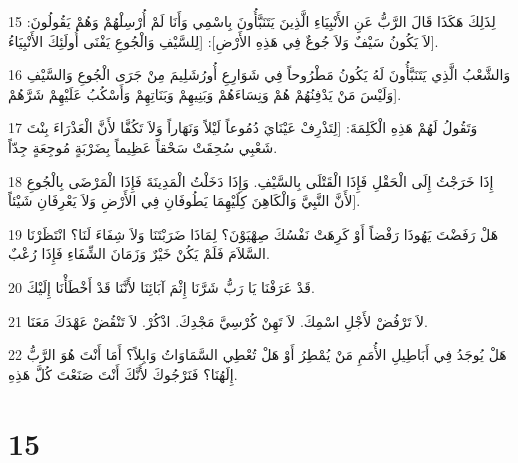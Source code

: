 \par 15 لِذَلِكَ هَكَذَا قَالَ الرَّبُّ عَنِ الأَنْبِيَاءِ الَّذِينَ يَتَنَبَّأُونَ بِاسْمِي وَأَنَا لَمْ أُرْسِلْهُمْ وَهُمْ يَقُولُونَ: [لاَ يَكُونُ سَيْفٌ وَلاَ جُوعٌ فِي هَذِهِ الأَرْضِ]: [لِلسَّيْفِ وَالْجُوعِ يَفْنَى أُولَئِكَ الأَنْبِيَاءُ.
\par 16 وَالشَّعْبُ الَّذِي يَتَنَبَّأُونَ لَهُ يَكُونُ مَطْرُوحاً فِي شَوَارِعِ أُورُشَلِيمَ مِنْ جَرَى الْجُوعِ وَالسَّيْفِ وَلَيْسَ مَنْ يَدْفِنُهُمْ هُمْ وَنِسَاءَهُمْ وَبَنِيهِمْ وَبَنَاتِهِمْ وَأَسْكُبُ عَلَيْهِمْ شَرَّهُمْ].
\par 17 وَتَقُولُ لَهُمْ هَذِهِ الْكَلِمَةَ: [لِتَذْرِفْ عَيْنَايَ دُمُوعاً لَيْلاً وَنَهَاراً وَلاَ تَكُفَّا لأَنَّ الْعَذْرَاءَ بِنْتَ شَعْبِي سُحِقَتْ سَحْقاً عَظِيماً بِضَرْبَةٍ مُوجِعَةٍ جِدّاً.
\par 18 إِذَا خَرَجْتُ إِلَى الْحَقْلِ فَإِذَا الْقَتْلَى بِالسَّيْفِ. وَإِذَا دَخَلْتُ الْمَدِينَةَ فَإِذَا الْمَرْضَى بِالْجُوعِ لأَنَّ النَّبِيَّ وَالْكَاهِنَ كِلَيْهِمَا يَطُوفَانِ فِي الأَرْضِ وَلاَ يَعْرِفَانِ شَيْئاً].
\par 19 هَلْ رَفَضْتَ يَهُوذَا رَفْضاً أَوْ كَرِهَتْ نَفْسُكَ صِهْيَوْنَ؟ لِمَاذَا ضَرَبْتَنَا وَلاَ شِفَاءَ لَنَا؟ انْتَظَرْنَا السَّلاَمَ فَلَمْ يَكُنْ خَيْرٌ وَزَمَانَ الشِّفَاءِ فَإِذَا رُعْبٌ.
\par 20 قَدْ عَرَفْنَا يَا رَبُّ شَرَّنَا إِثْمَ آبَائِنَا لأَنَّنَا قَدْ أَخْطَأْنَا إِلَيْكَ.
\par 21 لاَ تَرْفُضْ لأَجْلِ اسْمِكَ. لاَ تَهِنْ كُرْسِيَّ مَجْدِكَ. اذْكُرْ. لاَ تَنْقُضْ عَهْدَكَ مَعَنَا.
\par 22 هَلْ يُوجَدُ فِي أَبَاطِيلِ الأُمَمِ مَنْ يُمْطِرُ أَوْ هَلْ تُعْطِي السَّمَاوَاتُ وَابِلاً؟ أَمَا أَنْتَ هُوَ الرَّبُّ إِلَهُنَا؟ فَنَرْجُوكَ لأَنَّكَ أَنْتَ صَنَعْتَ كُلَّ هَذِهِ.

\chapter{15}

